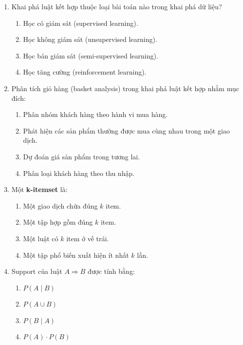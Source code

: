\documentclass[10pt]{article}
\begin{document}
\begin{enumerate}[leftmargin=*, label=\textbf{Câu \arabic*.}]

    \item Khai phá luật kết hợp thuộc loại bài toán nào trong khai phá dữ liệu?
    \begin{enumerate}[label=\Alph*.]
        \item Học có giám sát (supervised learning).
        \item Học không giám sát (unsupervised learning).
        \item Học bán giám sát (semi-supervised learning).
        \item Học tăng cường (reinforcement learning).
    \end{enumerate}

    \item Phân tích giỏ hàng (basket analysis) trong khai phá luật kết hợp nhằm mục đích:
    \begin{enumerate}[label=\Alph*.]
        \item Phân nhóm khách hàng theo hành vi mua hàng.
        \item Phát hiện các sản phẩm thường được mua cùng nhau trong một giao dịch.
        \item Dự đoán giá sản phẩm trong tương lai.
        \item Phân loại khách hàng theo thu nhập.
    \end{enumerate}

    \item Một \textbf{k-itemset} là:
    \begin{enumerate}[label=\Alph*.]
        \item Một giao dịch chứa đúng $k$ item.
        \item Một tập hợp gồm đúng $k$ item.
        \item Một luật có $k$ item ở vế trái.
        \item Một tập phổ biến xuất hiện ít nhất $k$ lần.
    \end{enumerate}

    \item Support của luật $A \Rightarrow B$ được tính bằng:
    \begin{enumerate}[label=\Alph*.]
        \item $P(A \mid B)$
        \item $P(A \cup B)$
        \item $P(B \mid A)$
        \item $P(A) \cdot P(B)$
    \end{enumerate}


\end{enumerate}
\end{document}

